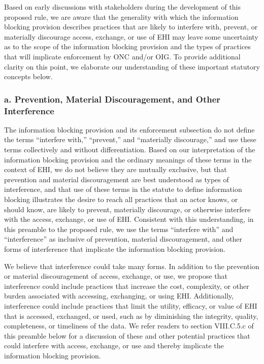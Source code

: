\documentclass[twoside,11pt]{article}
\begin{document}
          Based on early discussions with stakeholders during the development of this proposed rule, we are aware that the generality with which the information blocking provision describes practices that are likely to interfere with, prevent, or materially discourage access, exchange, or use of EHI may leave some uncertainty as to the scope of the information blocking provision and the types of practices that will implicate enforcement by ONC and/or OIG. To provide additional clarity on this point, we elaborate our understanding of these important statutory concepts below.


          \subsubsection{a. Prevention, Material Discouragement, and Other Interference}

          The information blocking provision and its enforcement subsection do not define the terms “interfere with,” “prevent,” and “materially discourage,” and use these terms collectively and without differentiation. Based on our interpretation of the information blocking provision and the ordinary meanings of these terms in the context of EHI, we do not believe they are mutually exclusive, but that prevention and material discouragement are best understood as types of interference, and that use of these terms in the statute to define information blocking illustrates the desire to reach all practices that an actor knows, or should know, are likely to prevent, materially discourage, or otherwise interfere with the access, exchange, or use of EHI. Consistent with this understanding, in this preamble to the proposed rule, we use the terms “interfere with” and “interference” as inclusive of prevention, material discouragement, and other forms of interference that implicate the information blocking provision.


          We believe that interference could take many forms. In addition to the prevention or material discouragement of access, exchange, or use, we propose that interference could include practices that increase the cost, complexity, or other burden associated with accessing, exchanging, or using EHI. Additionally, interference could include practices that limit the utility, efficacy, or value of EHI that is accessed, exchanged, or used, such as by diminishing the integrity, quality, completeness, or timeliness of the data. We refer readers to section VIII.C.5.c of this preamble below for a discussion of these and other potential practices that could interfere with access, exchange, or use and thereby implicate the information blocking provision.
\end{document}
